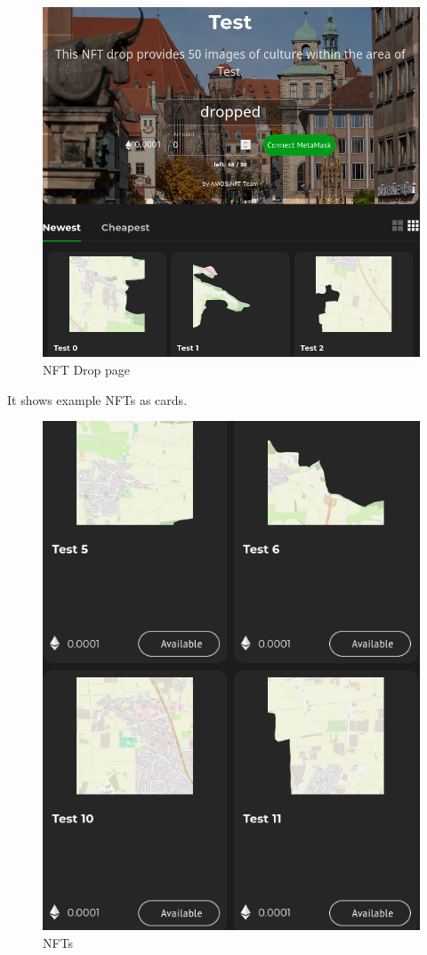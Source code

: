 \documentclass[
]{article}
\begin{document}
\begin{figure}
\centering
\includegraphics{images/NFT_Drop_page.png}
\caption{NFT Drop page}
\end{figure}

It shows example NFTs as cards.

\begin{figure}
\centering
\includegraphics{images/NFTs.png}
\caption{NFTs}
\end{figure}\newpage
\end{document}
